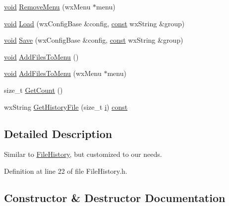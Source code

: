 \begin{DoxyCompactItemize}
\item 
\hyperlink{sound_8c_ae35f5844602719cf66324f4de2a658b3}{void} \hyperlink{class_file_history_ac6c3c839e8e02931d51e43c96be631e7}{Remove\+Menu} (wx\+Menu $\ast$menu)
\item 
\hyperlink{sound_8c_ae35f5844602719cf66324f4de2a658b3}{void} \hyperlink{class_file_history_a01708d49e6b64b405bc94316ec643c66}{Load} (wx\+Config\+Base \&config, \hyperlink{getopt1_8c_a2c212835823e3c54a8ab6d95c652660e}{const} wx\+String \&group)
\item 
\hyperlink{sound_8c_ae35f5844602719cf66324f4de2a658b3}{void} \hyperlink{class_file_history_a1f0fe170ea5b94062d7493fbe06d3ada}{Save} (wx\+Config\+Base \&config, \hyperlink{getopt1_8c_a2c212835823e3c54a8ab6d95c652660e}{const} wx\+String \&group)
\item 
\hyperlink{sound_8c_ae35f5844602719cf66324f4de2a658b3}{void} \hyperlink{class_file_history_acded3496831e3daccddaba0675ebead4}{Add\+Files\+To\+Menu} ()
\item 
\hyperlink{sound_8c_ae35f5844602719cf66324f4de2a658b3}{void} \hyperlink{class_file_history_a895f895fb623c9f34b7eb4df78960f4f}{Add\+Files\+To\+Menu} (wx\+Menu $\ast$menu)
\item 
size\+\_\+t \hyperlink{class_file_history_ac43f016e9ca72cfcdaaad32d9e90eb60}{Get\+Count} ()
\item 
wx\+String \hyperlink{class_file_history_ab70d4a1b7a61d77225c1f4530f04634b}{Get\+History\+File} (size\+\_\+t \hyperlink{checksum_8c_ab80e330a3bc9e38c1297fe17381e92b4}{i}) \hyperlink{getopt1_8c_a2c212835823e3c54a8ab6d95c652660e}{const} 
\end{DoxyCompactItemize}


\subsection{Detailed Description}
Similar to \hyperlink{class_file_history}{File\+History}, but customized to our needs. 

Definition at line 22 of file File\+History.\+h.



\subsection{Constructor \& Destructor Documentation}
